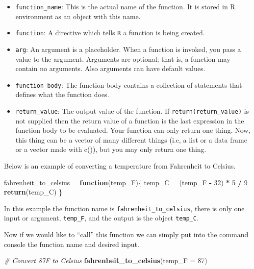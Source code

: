 \documentclass[
]{book}
\newenvironment{Shaded}{\begin{snugshade}}{\end{snugshade}}
\newcommand{\CommentTok}[1]{\textcolor[rgb]{0.56,0.35,0.01}{\textit{#1}}}
\newcommand{\ControlFlowTok}[1]{\textcolor[rgb]{0.13,0.29,0.53}{\textbf{#1}}}
\newcommand{\DataTypeTok}[1]{\textcolor[rgb]{0.13,0.29,0.53}{#1}}
\newcommand{\DecValTok}[1]{\textcolor[rgb]{0.00,0.00,0.81}{#1}}
\newcommand{\KeywordTok}[1]{\textcolor[rgb]{0.13,0.29,0.53}{\textbf{#1}}}
\newcommand{\NormalTok}[1]{#1}
\newcommand{\OperatorTok}[1]{\textcolor[rgb]{0.81,0.36,0.00}{\textbf{#1}}}
\newcommand{\StringTok}[1]{\textcolor[rgb]{0.31,0.60,0.02}{#1}}
\providecommand{\tightlist}{%
  \setlength{\itemsep}{0pt}\setlength{\parskip}{0pt}}
\begin{document}
\begin{itemize}
\tightlist
\item
  \texttt{function\_name}: This is the actual name of the function. It is stored in R environment as an object with this name.
\item
  \texttt{function}: A directive which tells \texttt{R} a function is being created.
\item
  \texttt{arg}: An argument is a placeholder. When a function is invoked, you pass a value to the argument. Arguments are optional; that is, a function may contain no arguments. Also arguments can have default values.
\item
  \texttt{function\ body}: The function body contains a collection of statements that defines what the function does.
\item
  \texttt{return\_value}: The output value of the function. If \texttt{return(return\_value)} is not supplied then the return value of a function is the last expression in the function body to be evaluated. Your function can only return one thing. Now, this thing can be a vector of many different things
  (i.e, a list or a data frame or a vector made with c()), but you may only return one thing.
\end{itemize}

Below is an example of converting a temperature from Fahrenheit to Celsius.

\begin{Shaded}
\begin{Highlighting}[]
\NormalTok{fahrenheit_to_celsius =}\StringTok{ }\ControlFlowTok{function}\NormalTok{(temp_F)\{}
\NormalTok{  temp_C =}\StringTok{ }\NormalTok{(temp_F }\OperatorTok{-}\StringTok{ }\DecValTok{32}\NormalTok{) }\OperatorTok{*}\StringTok{ }\DecValTok{5} \OperatorTok{/}\StringTok{ }\DecValTok{9}
  \KeywordTok{return}\NormalTok{(temp_C)}
\NormalTok{\}}
\end{Highlighting}
\end{Shaded}

In this example the function name is \texttt{fahrenheit\_to\_celsius}, there is only one input or argument, \texttt{temp\_F}, and the output is the object \texttt{temp\_C}.

Now if we would like to ``call'' this function we can simply put into the command console the function name and desired input.

\begin{Shaded}
\begin{Highlighting}[]
\CommentTok{# Convert 87F to Celsius}
\KeywordTok{fahrenheit_to_celsius}\NormalTok{(}\DataTypeTok{temp_F =} \DecValTok{87}\NormalTok{)}
\end{Highlighting}
\end{Shaded}
\end{document}
